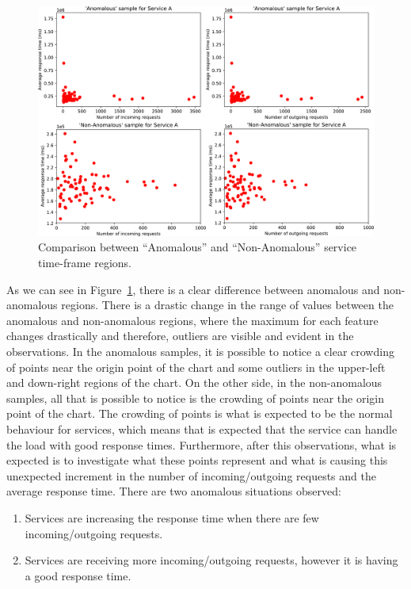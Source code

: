 \begin{figure}
  \centering\includegraphics[width=1.0\linewidth]{images/result_samples_for_service_a.pdf}
  \caption{Comparison between ``Anomalous'' and ``Non-Anomalous'' service time-frame regions.}
  \label{fig:comparison_anomalous_non_anomalous_regions}
\end{figure}

As we can see in Figure~\ref{fig:comparison_anomalous_non_anomalous_regions}, there is a clear difference between anomalous and non-anomalous regions. There is a drastic change in the range of values between the anomalous and non-anomalous regions, where the maximum for each feature changes drastically and therefore, outliers are visible and evident in the observations. In the anomalous samples, it is possible to notice a clear crowding of points near the origin point of the chart and some outliers in the upper-left and down-right regions of the chart. On the other side, in the non-anomalous samples, all that is possible to notice is the crowding of points near the origin point of the chart. The crowding of points is what is expected to be the normal behaviour for services, which means that is expected that the service can handle the load with good response times. Furthermore, after this observations, what is expected is to investigate what these points represent and what is causing this unexpected increment in the number of incoming/outgoing requests and the average response time. There are two anomalous situations observed:

\begin{enumerate}
  \item Services are increasing the response time when there are few incoming/outgoing requests.
  \item Services are receiving more incoming/outgoing requests, however it is having a good response time.
\end{enumerate}

